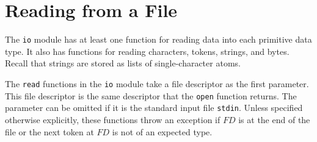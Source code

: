 \section{Reading from a File}
The \texttt{io} module has at least one function for reading data into each primitive data type.  It also has functions for reading characters, tokens, strings, and bytes.  Recall that strings are stored as lists of single-character atoms.

The \texttt{read} functions in the \texttt{io} module take a file descriptor as the first parameter.  This file descriptor is the same descriptor that the \texttt{open} function returns. The parameter can be omitted if it is the standard input file \texttt{stdin}. Unless specified otherwise explicitly, these functions throw an exception if $FD$ is at the end of the file or the next token at $FD$ is not of an expected type.

